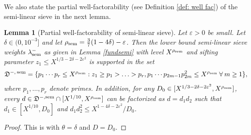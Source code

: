 \documentclass[12pt]{amsart}
\numberwithin{equation}{section}
\newtheorem{lemma}[theorem]{Lemma}
\theoremstyle{remark}
\theoremstyle{definition}
\begin{document}
We also state the partial well-factorability (see Definition \ref{def: well fac}) of the semi-linear sieve in the next lemma.

\begin{lemma}[Partial well-factorability of semi-linear sieve]\label{wellfacsem}
Let $\varepsilon>0$ be small. Let $\delta\in (0, 10^{-3}]$ and let $\rho_{\textup{sem}}=\frac{3}{7}(1-4\delta)-\varepsilon$. Then the lower bound semi-linear sieve weights $\lambda_{\textup{sem}}^-$ as given in Lemma \ref{fundsemi} with level $X^{\rho_{\textup{sem}}}$ and sifting parameter $z_1\leq X^{1/3-2\delta-2\varepsilon^2}$ is supported in the set 
\begin{align}
\mathfrak{D}^{-,\: \textup{sem}}=\{p_1\cdots p_r\leq X^{\rho_{\textup{sem}}}: z_1\geq p_1> \dotsc >p_r, p_1\cdots p_{2m-1}p_{2m}^2\leq X^{\rho_{\textup{sem}}}\: \forall \: m \geq 1\},
\end{align}
where $p_1, \dotsc, p_r$ denote primes. In addition, for any $D_0\in [X^{1/3-2\delta-2\varepsilon^2}, X^{\rho_{\textup{sem}}}]$, every $d\in \mathfrak{D}^{-, \textup{sem}}\cap[X^{1/10}, X^{\rho_{\textup{sem}}}]$ can be factorized as $d=d_1d_2$ such that $d_1\in [X^{1/10}, D_0]$ and $d_1d_2^2\leq X^{1-4\delta-2\varepsilon^2}/D_0$.
\end{lemma}
\begin{proof}
This is \cite[Lemma 9.2]{Ter} with $\theta=\delta$ and $D=D_0$. 
\end{proof}
\end{document}
